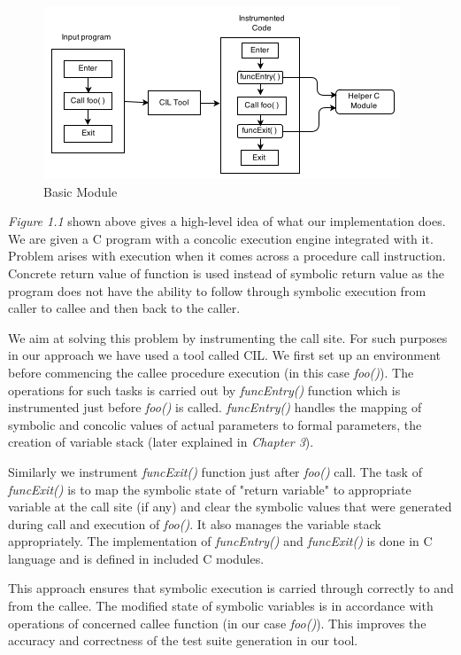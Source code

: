 \documentclass[12pt,oneside]{book}
\begin{document}
\begin{figure}[htbp]
\centering
\includegraphics[scale=1]{module3.png}
\caption{Basic Module}
\end{figure}

\textit{Figure 1.1} shown above gives a high-level idea of what our implementation does. We are given a C program with a concolic execution engine integrated with it. Problem arises with execution when it comes across a procedure call instruction. Concrete return value of function is used instead of symbolic return value as the program does not have the ability to follow through symbolic execution from caller to callee and then back to the caller.

We aim at solving this problem by instrumenting the call site. For such purposes in our approach we have used a tool called CIL\cite{cil}. We first set up an environment before commencing the callee procedure execution (in this case \textit{foo()}). The operations for such tasks is carried out by \textit{funcEntry()} function which is instrumented just before \textit{foo()} is called. \textit{funcEntry()} handles the mapping of symbolic and concolic values of actual parameters to formal parameters, the creation of variable stack (later explained in \textit{Chapter 3}).

Similarly we instrument \textit{funcExit()} function just after \textit{foo()} call. The task of \textit{funcExit()} is to map the symbolic state of "return variable" to appropriate variable at the call site (if any) and clear the symbolic values that were generated during call and execution of \textit{foo()}. It also manages the variable stack appropriately. The implementation of \textit{funcEntry()} and \textit{funcExit()} is done in C language and is defined in included C modules.

This approach ensures that symbolic execution is carried through correctly to and from the callee. The modified state of symbolic variables is in accordance with operations of concerned callee function (in our case \textit{foo()}). This improves the accuracy and correctness of the test suite generation in our tool.  
\end{document}
